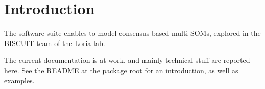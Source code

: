 
\section{Introduction}

The \CxSOM software suite enables to model consensus based multi-SOMs, explored in the BISCUIT team of the Loria lab.

The current documentation is at work, and mainly technical stuff are reported here. See the README at the package root for an introduction, as well as examples. 
